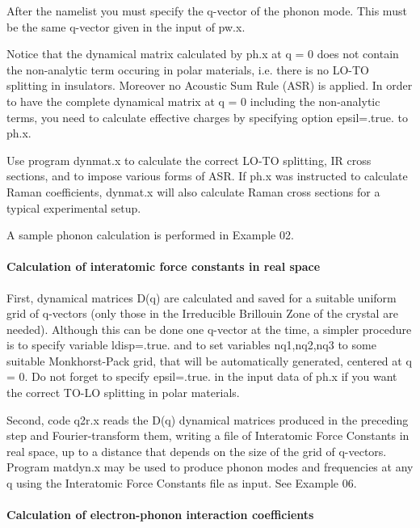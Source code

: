 \documentclass[12pt,a4paper]{article}
\begin{document}
After the namelist you must specify the q-vector of the phonon mode.
This must be the same q-vector given in the input of pw.x.
    
Notice that the dynamical matrix calculated by ph.x at q = 0 does not
contain the non-analytic term occuring in polar materials, i.e. there is no
LO-TO splitting in insulators. Moreover no Acoustic Sum Rule (ASR) is
applied. In order to have the complete dynamical matrix at q = 0 including
the non-analytic terms, you need to calculate effective charges by specifying
option epsil=.true. to ph.x.

Use program dynmat.x to calculate the correct LO-TO splitting, IR cross
sections, and to impose various forms of ASR. If ph.x was instructed to 
calculate Raman coefficients, dynmat.x will also calculate Raman cross sections
for a typical experimental setup.
    
A sample phonon calculation is performed in Example 02.

\paragraph{Calculation of interatomic force constants in real space}

First, dynamical matrices D(q) are calculated and saved for a suitable uniform 
grid of q-vectors (only those in the Irreducible Brillouin Zone of the
crystal are needed). Although this can be done one q-vector at the time, a
simpler procedure is to specify variable ldisp=.true. and to set variables
nq1,nq2,nq3 to some suitable Monkhorst-Pack grid, that will be automatically
generated, centered at q = 0. Do not forget to specify epsil=.true.
in the input data of ph.x if you want the correct TO-LO splitting in polar
materials.
    
Second, code q2r.x reads the D(q) dynamical matrices produced in the
preceding step and Fourier-transform them, writing a file of Interatomic Force
Constants in real space, up to a distance that depends on the size of the grid
of q-vectors. Program matdyn.x may be used to produce phonon modes and
frequencies at any q using the Interatomic Force Constants file as input.
See Example 06.

\paragraph{Calculation of electron-phonon interaction coefficients}
\end{document}
